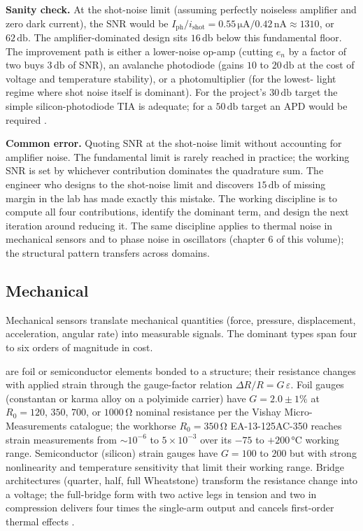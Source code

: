 \textbf{Sanity check.} At the shot-noise limit (assuming
perfectly noiseless amplifier and zero dark current), the SNR
would be $I_{\text{ph}}/i_{\text{shot}} = 0.55 \,\si{\micro
\ampere}/0.42 \,\si{\nano\ampere} \approx 1310$, or $62 \,\si
{\decibel}$. The amplifier-dominated design sits $16 \,\si
{\decibel}$ below this fundamental floor. The improvement path is
either a lower-noise op-amp (cutting $e_{n}$ by a factor of two
buys $3 \,\si{\decibel}$ of SNR), an avalanche photodiode (gains
$10$ to $20 \,\si{\decibel}$ at the cost of voltage and
temperature stability), or a photomultiplier (for the lowest-
light regime where shot noise itself is dominant). For the
project's $30 \,\si{\decibel}$ target the simple silicon-photodiode
TIA is adequate; for a $50 \,\si{\decibel}$ target an APD would
be required \cite{text:ch05-pallas-areny-webster2001}.

\textbf{Common error.} Quoting SNR at the shot-noise limit without
accounting for amplifier noise. The fundamental limit is rarely
reached in practice; the working SNR is set by whichever
contribution dominates the quadrature sum. The engineer who
designs to the shot-noise limit and discovers $15 \,\si{\decibel}$
of missing margin in the lab has made exactly this mistake. The
working discipline is to compute all four contributions, identify
the dominant term, and design the next iteration around reducing
it. The same discipline applies to thermal noise in mechanical
sensors and to phase noise in oscillators (chapter 6 of this
volume); the structural pattern transfers across domains.

\subsection{Mechanical}

Mechanical sensors translate mechanical quantities (force,
pressure, displacement, acceleration, angular rate) into
measurable signals. The dominant types span four to six orders of
magnitude in cost.

 are foil or semiconductor elements
bonded to a structure; their resistance changes with applied
strain through the gauge-factor relation $\Delta R/R = G\,
\varepsilon$. Foil gauges (constantan or karma alloy on a
polyimide carrier) have $G = 2.0 \pm 1\%$ at $R_{0} = 120$, $350$,
$700$, or $1000\,\si{\ohm}$ nominal resistance per the Vishay
Micro-Measurements catalogue; the workhorse $R_{0} = 350\,\si{
\ohm}$ EA-13-125AC-350 reaches strain measurements from
$\sim 10^{-6}$ to $5 \times 10^{-3}$ over its $-75$ to
$+200\,\si{\degreeCelsius}$ working range. Semiconductor (silicon)
strain gauges have $G = 100$ to $200$ but with strong nonlinearity
and temperature sensitivity that limit their working range.
Bridge architectures (quarter, half, full Wheatstone) transform
the resistance change into a voltage; the full-bridge form with
two active legs in tension and two in compression delivers four
times the single-arm output and cancels first-order thermal
effects \cite{text:ch05-pallas-areny-webster2001}.

